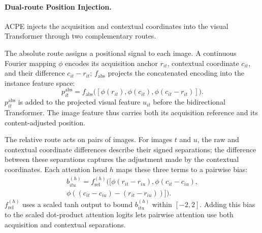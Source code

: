 
\paragraph{Dual-route Position Injection.}
ACPE injects the acquisition and contextual coordinates into the visual
Transformer through two complementary routes.

The absolute route assigns a positional signal to each image.  A continuous
Fourier mapping $\phi$ encodes its acquisition anchor
$r_{it}$, contextual coordinate $c_{it}$, and their difference $c_{it}-r_{it}$;
$f_{\mathrm{abs}}$ projects the concatenated encoding into the instance feature
space:
\begin{equation}
p^{\mathrm{abs}}_{it}
=
f_{\mathrm{abs}}\bigl(
[\phi(r_{it}),\phi(c_{it}),\phi(c_{it}-r_{it})]
\bigr).
\label{eq:acpe_abs_new}
\end{equation}
$p^{\mathrm{abs}}_{it}$ is added to the projected visual feature $u_{it}$
before the bidirectional Transformer.  The image feature thus carries both
its acquisition reference and its content-adjusted position.

The relative route acts on pairs of images.  For images $t$ and $u$, the raw
and contextual coordinate differences describe their signed separations;
the difference between these separations captures the adjustment made by
the contextual coordinates.  Each attention head $h$ maps these three terms
to a pairwise bias:
\begin{equation}
\begin{aligned}
b^{(h)}_{itu}
=
f^{(h)}_{\mathrm{rel}}\bigl(
[\phi(r_{it}-r_{iu}),
\phi(c_{it}-c_{iu}),\\[-1mm]
\phi((c_{it}-c_{iu})-(r_{it}-r_{iu}))]
\bigr).
\end{aligned}
\label{eq:acpe_rel_new}
\end{equation}
$f^{(h)}_{\mathrm{rel}}$ uses a scaled tanh output to bound
$b^{(h)}_{itu}$ within $[-2,2]$.  Adding this bias to the scaled dot-product
attention logits lets pairwise attention use both acquisition and contextual
separations.

